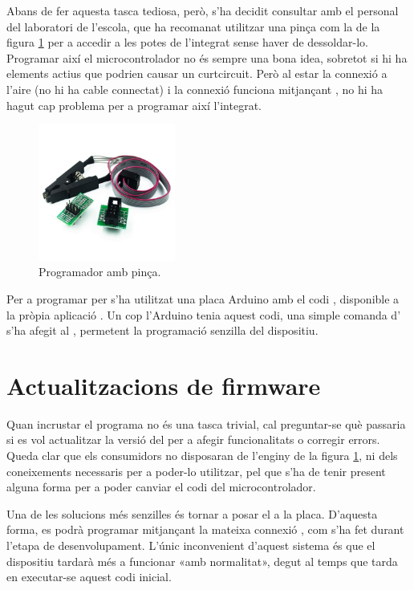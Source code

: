 Abans de fer aquesta tasca tediosa, però, s'ha decidit consultar amb el
personal del laboratori de l'escola, que ha recomanat utilitzar una pinça com
la de la figura \ref{fig:programmer} per a accedir a les potes de l'integrat sense haver
de dessoldar-lo. Programar així el microcontrolador no és sempre una bona idea,
sobretot si hi ha elements actius que podrien causar un curtcircuit. Però al estar
la connexió  a l'aire (no hi ha cable connectat) i la connexió
 funciona mitjançant , no hi ha hagut cap problema per
a programar així l'integrat.

\begin{figure}[ht]
    \centering
    \includegraphics[width=0.4\textwidth]{images/device/programmer.jpeg}
    \caption{Programador  amb pinça.}
    \label{fig:programmer}
\end{figure}

Per a programar per  s'ha utilitzat una placa Arduino amb el codi
, disponible a la pròpia aplicació 
\cite{ArduinoIsp}. Un cop
l'Arduino tenia aquest codi, una simple comanda d' s'ha afegit
al , permetent la programació senzilla del dispositiu.

\section{Actualitzacions de firmware}

Quan incrustar el programa no és una tasca trivial, cal preguntar-se què
passaria si  es vol actualitzar la versió del  per a afegir
funcionalitats o corregir errors. Queda clar que els consumidors no disposaran
de l'enginy de la figura \ref{fig:programmer}, ni dels coneixements necessaris
per a poder-lo utilitzar, pel que s'ha de tenir present alguna forma per a
poder canviar el codi del microcontrolador.

Una de les solucions més senzilles és tornar a posar el  a la
placa. D'aquesta forma, es podrà programar mitjançant la mateixa connexió
, com s'ha fet durant l'etapa de desenvolupament. L'únic inconvenient
d'aquest sistema és que el dispositiu tardarà més a funcionar «amb normalitat»,
degut al temps que tarda en executar-se aquest codi inicial.

